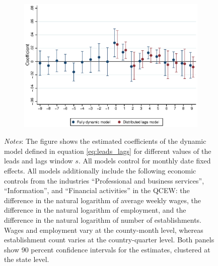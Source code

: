 \begin{figure}[htb!]
\begin{subfigure}[b]{0.5\textwidth}
		\includegraphics[width = .985\textwidth]
		{../../analysis/first_differences/output/fd_models_coeffs_w9.eps}
	\end{subfigure}
	\begin{minipage}{0.95\textwidth} \footnotesize
		\vspace{2mm} 
		\textit{Notes}: The figure shows the estimated coefficients of the dynamic model defined 
		in equation \autoref{eq:leads_lags} for different values of the leads and lags window $s$.
		All models control for 	monthly date fixed effects. All models additionally include the
		following economic controls from the industries ``Professional and business services'', 
		``Information'', and ``Financial activities'' in the QCEW: the difference in the natural 
		logarithm of average weekly wages, the difference in the natural logarithm of employment, 
		and the difference in the natural logarithm of number of establishments. Wages and 
		employment vary at the county-month level, whereas establishment count varies at the 
		country-quarter level. Both panels	show 90 percent confidence intervals for the estimates, 
		clustered at the state level.
	\end{minipage}
\end{figure}

